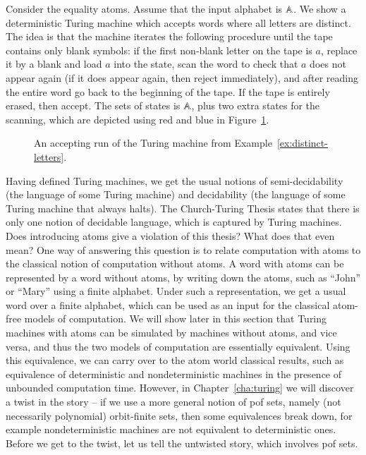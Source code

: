 \begin{myexample}\label{ex:distinct-letters}
	Consider the equality atoms.
		Assume that the input alphabet is $\mathbb A$. 	We show a deterministic Turing machine which accepts words where all letters are distinct.
		The idea is that the machine iterates the following procedure until the tape contains only blank symbols: if the first non-blank letter on the tape is $a$, replace it by a blank and load $a$ into the state, scan the word to check that $a$ does not appear again (if it does appear again, then reject immediately), and after reading the entire word go back to the beginning of the tape. If the tape is entirely erased, then accept. The sets of states is $\mathbb A$, plus two extra states for the scanning, which are depicted using red and blue in Figure~\ref{fig:distinct-turing}. 
\begin{figure}
\caption{\label{fig:distinct-turing}An accepting run of the Turing machine from Example~\ref{ex:distinct-letters}.}
\end{figure}
\end{myexample}

Having defined Turing machines, we get the usual notions of semi-decidability (the language of some Turing machine) and decidability (the language of some Turing machine that always halts).
The Church-Turing Thesis states that there is only one notion of decidable language, which is captured by Turing machines. Does introducing atoms give a violation of this thesis? What does that even mean? One way of answering this question is to relate computation with atoms to the classical notion of computation without atoms. A word with atoms can be represented by a word without atoms, by writing down the atoms, such as ``John'' or ``Mary'' using a finite alphabet. Under such a representation, we  get a usual word over a finite alphabet, which can be used as an input for the classical atom-free models of computation. We will show later in this section that Turing machines with atoms can be simulated by machines without atoms, and vice versa, and thus the two models of computation are essentially equivalent. Using this equivalence, we can carry over to the atom world classical results, such as equivalence of deterministic and nondeterministic machines in the presence of unbounded computation time. However, in  Chapter~\ref{cha:turing} we will discover a twist in the story -- if we use a more general notion of pof sets, namely (not necessarily polynomial) orbit-finite sets, then some  equivalences break down, for example nondeterministic machines are not equivalent to deterministic ones. Before we get to the twist, let us tell the untwisted story, which involves pof sets. 

